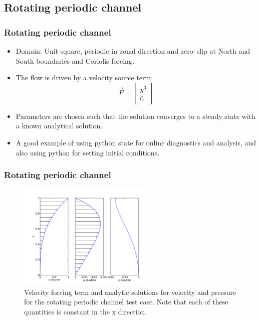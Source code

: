 \subsection{Rotating periodic channel}

\begin{frame}
    \frametitle{Rotating periodic channel}
\begin{itemize}
\item Domain: Unit square, periodic in zonal direction and zero--slip at North and South boundaries and Coriolis forcing.
\item The flow is driven by a velocity source term:
\begin{equation*}
  \vec{F}=
  \begin{bmatrix}
    y^3 \\
    0
  \end{bmatrix}
\end{equation*}
\item Parameters are chosen such that the solution converges to a steady state with a known analytical solution.
\item A good example of using python state for online diagnostics and analysis, and also using python for setting initial conditions.
\end{itemize}
\end{frame}
%
\begin{frame}
    \frametitle{Rotating periodic channel}
\begin{figure}
\includegraphics[width=0.6\textwidth]{./rotating_channel/analytic_solution}
\caption{Velocity forcing term and analytic solutions for velocity and pressure for the rotating periodic channel test case. Note that each of these quantities is constant in the x direction.}
\end{figure}
\end{frame}
%
